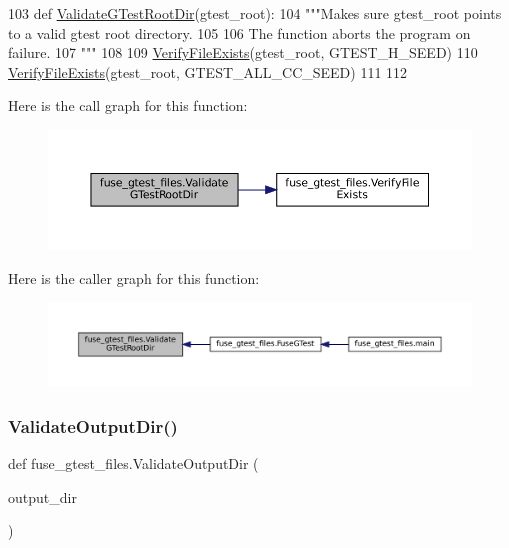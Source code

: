 \begin{DoxyCode}
103 \textcolor{keyword}{def }\hyperlink{namespacefuse__gtest__files_aa53690cd3c4ff01cfeea470f363f1dec}{ValidateGTestRootDir}(gtest\_root):
104   \textcolor{stringliteral}{"""Makes sure gtest\_root points to a valid gtest root directory.}
105 \textcolor{stringliteral}{}
106 \textcolor{stringliteral}{  The function aborts the program on failure.}
107 \textcolor{stringliteral}{  """}
108 
109   \hyperlink{namespacefuse__gtest__files_a333eb5237899fe2f80b0c624ddba363d}{VerifyFileExists}(gtest\_root, GTEST\_H\_SEED)
110   \hyperlink{namespacefuse__gtest__files_a333eb5237899fe2f80b0c624ddba363d}{VerifyFileExists}(gtest\_root, GTEST\_ALL\_CC\_SEED)
111 
112 
\end{DoxyCode}
Here is the call graph for this function\+:
\nopagebreak
\begin{figure}[H]
\begin{center}
\leavevmode
\includegraphics[width=350pt]{namespacefuse__gtest__files_aa53690cd3c4ff01cfeea470f363f1dec_cgraph}
\end{center}
\end{figure}
Here is the caller graph for this function\+:
\nopagebreak
\begin{figure}[H]
\begin{center}
\leavevmode
\includegraphics[width=350pt]{namespacefuse__gtest__files_aa53690cd3c4ff01cfeea470f363f1dec_icgraph}
\end{center}
\end{figure}
\mbox{\label{namespacefuse__gtest__files_a9f584226b1f996ffff820e0751dbd458}} 
\subsubsection{\texorpdfstring{Validate\+Output\+Dir()}{ValidateOutputDir()}}
{\footnotesize\ttfamily def fuse\+\_\+gtest\+\_\+files.\+Validate\+Output\+Dir (\begin{DoxyParamCaption}\item[{}]{output\+\_\+dir }\end{DoxyParamCaption})}

